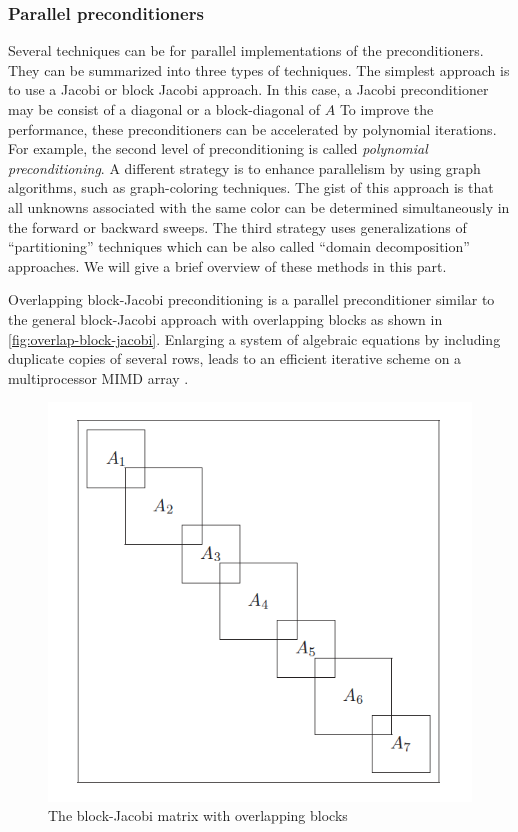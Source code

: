 \subsubsection{Parallel preconditioners}
Several techniques can be for parallel implementations of the preconditioners. They can be summarized into three types of techniques.
The simplest approach is to use a Jacobi or block Jacobi approach. In this case, a Jacobi preconditioner may be consist of a diagonal or a block-diagonal of $A$
To improve the performance, these preconditioners can be accelerated by polynomial iterations. For example, the second level of preconditioning is called \textit{polynomial preconditioning}.
A different strategy is to enhance parallelism by using graph algorithms, such as graph-coloring techniques. The gist of this approach is that all unknowns associated with the same color can be determined simultaneously in the forward or backward sweeps.
The third strategy uses generalizations of ``partitioning'' techniques which can be also called ``domain decomposition'' approaches.
We will give a brief overview of these methods in this part.

Overlapping block-Jacobi preconditioning is a parallel preconditioner similar to the general block-Jacobi approach with overlapping blocks as shown in \autoref{fig:overlap-block-jacobi}. Enlarging a system of algebraic equations by including duplicate copies of several rows, leads to an efficient iterative scheme on a multiprocessor MIMD array \citep{WAIT1988325}. 
\begin{figure}[h!]
    \centering
    \includegraphics[width=\linewidth]{figures/block-jacobi.png}
    \caption{The block-Jacobi matrix with overlapping blocks \citep{doi:10.1137/1.9780898718003}}
    \label{fig:overlap-block-jacobi}
\end{figure}


